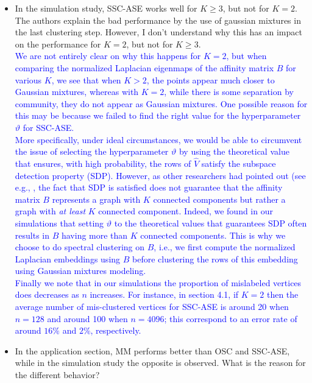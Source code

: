 \documentclass[
]{article}
\begin{document}
\begin{itemize}
{  }
\item
  In the simulation study, SSC-ASE works well for \(K \geq 3\), but not
  for \(K = 2\). The authors explain the bad performance by the use of
  gaussian mixtures in the last clustering step. However, I don't
  understand why this has an impact on the performance for \(K = 2\),
  but not for \(K \geq 3\).\\
  \textcolor{blue}{
  We are not entirely clear on why this happens for $K = 2$, but when
  comparing the normalized Laplacian eigenmaps of the affinity matrix
  $B$ for various $K$, we see that when $K > 2$, the points appear much
  closer to Gaussian mixtures, whereas with $K = 2$, while there is some
  separation by community, they do not appear as Gaussian mixtures. 
  One possible reason for this may be because we failed to find the
  right value for the hyperparameter $\vartheta$ for SSC-ASE. 
  }\\
  \textcolor{blue}{
  More specifically, under ideal circumstances, we would be able to
  circumvent the issue of selecting the hyperparameter $\vartheta$ by
  using the theoretical value that ensures, with high probability, the rows of $\hat{V}$ satisfy the subspace
  detection property (SDP). However, as other researchers had pointed out (see
  e.g., \citep{sdp_sufficiency,liu_ssc}, the fact that SDP is satisfied
  does not guarantee that the affinity matrix $B$ represents a graph
  with $K$ connected components but rather a graph with {\em at least}
  $K$ connected component. Indeed, we found in our simulations that
  setting $\vartheta$ to the theoretical values that guarantees 
  SDP often results in $B$ having more than $K$ connected components.
  This is why we choose to do spectral clustering on $B$, i.e., we first
  compute the normalized Laplacian embeddings using $B$ before
  clustering the rows of this embedding using Gaussian mixtures
  modeling. 
  }\\
  \textcolor{blue}{
  Finally we note that in our simulations the proportion of mislabeled
  vertices does decreases as $n$ increases. 
  For instance, in section 4.1, if $K = 2$ then the average number of mis-clustered
  vertices for SSC-ASE is around 20 when $n = 128$ and around 100 when
  $n = 4096$; this correspond to an error rate of around $16\%$ and
  $2\%$, respectively.
  }
\item
  In the application section, MM performs better than OSC and SSC-ASE,
  while in the simulation study the opposite is observed. What is the
  reason for the different behavior?\\

\end{itemize}
\end{document}
